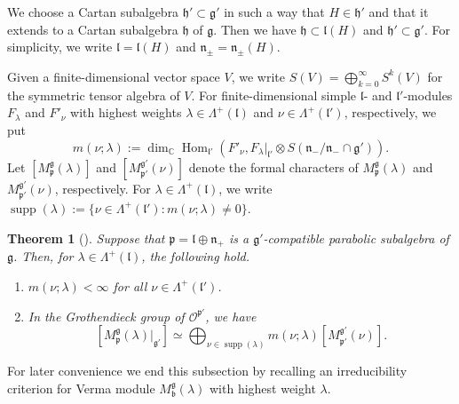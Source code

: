 \documentclass[a4paper,11pt,reqno]{amsart}
\newcommand{\frakg}{\mathfrak{g}}
\newcommand{\frakh}{\mathfrak{h}}
\newcommand{\frakn}{\mathfrak{n}}
\newcommand{\frakp}{\mathfrak{p}}
\newcommand{\0}{{\bf 0}}
\newcommand{\C}{\mathbb{C}}
\newcommand{\1}{{\bf 1}}
\DeclareMathOperator{\Hom}{Hom}
\newcommand{\frakb}{{\mathfrak b}}
\newcommand{\frakl}{{\mathfrak l}}
\DeclareMathOperator{\supp}{supp}
\newcommand{\Mb}{M^{\frakg}_{\frakb}}
\newcommand{\Mp}{M^{\frakg}_{\frakp}}
\newcommand{\Mpp}{M^{\frakg'}_{\frakp'}}
\theoremstyle{plain}
\newtheorem{theorem}[equation]{Theorem}
\theoremstyle{definition}
\numberwithin{equation}{section}
\theoremstyle{definition}
\begin{document}
We choose a Cartan subalgebra
$\frakh' \subset \frakg'$ in such a way that  $H \in \frakh'$ and that
it extends to a Cartan subalgebra $\frakh$ of $\frakg$. Then we have 
$\frakh \subset \frakl(H)$
and $\frakh' \subset \frakg'$. For simplicity, we write 
$\frakl =\frakl(H)$ and $\frakn_{\pm}=\frakn_{\pm}(H)$.

Given a finite-dimensional vector space $V$, we write 
$S(V)=\bigoplus_{k=0}^\infty S^k(V)$ for the symmetric tensor algebra 
of $V$. 
For finite-dimensional simple $\frakl$- and $\frakl'$-modules
$F_\lambda$ and $F'_\nu$ with highest weights $\lambda \in \Lambda^+(\frakl)$
and $\nu \in \Lambda^+(\frakl')$, respectively, we put
\begin{equation*}
m(\nu;\lambda):=
\dim_\C
\Hom_{\frakl'}(F'_\nu, F_\lambda\vert_{\frakl'} \otimes S(\frakn_-/\frakn_-\cap \frakg')).
\end{equation*}
Let $[\Mp(\lambda)]$ and $[\Mpp(\nu)]$ denote the formal characters 
of $\Mp(\lambda)$ and $\Mpp(\nu)$, respectively.
For $\lambda \in \Lambda^+(\frakl)$,
we write  $\supp(\lambda) := \{\nu \in \Lambda^+(\frakl'):m(\nu;\lambda)\neq 0\}$.

\begin{theorem}[{\cite[Thm.\ 3.10]{Kobayashi12}}]\label{thm:bGVM}
Suppose that $\frakp=\frakl \oplus \frakn_+$ is a $\frakg'$-compatible parabolic subalgebra
of $\frakg$. Then, for $\lambda \in \Lambda^+(\frakl)$,  the following hold.

\begin{enumerate}
\item[\emph{(1)}]
$m(\nu;\lambda) < \infty$ for all $\nu \in \Lambda^+(\frakl')$.

\item[\emph{(2)}]
In the Grothendieck group of $\mathcal{O}^{\frakp'}$, we have
\begin{equation}\label{eqn:bGVM}
[\Mp(\lambda)\vert_{\frakg'}]
\simeq 
\bigoplus_{\nu \in \supp(\lambda)}
m(\nu; \lambda) [\Mpp(\nu)].
\end{equation}
\end{enumerate}
\end{theorem}

For later convenience we end this subsection by recalling 
an irreducibility criterion for Verma module $\Mb(\lambda)$
with highest weight $\lambda$.
\end{document}
